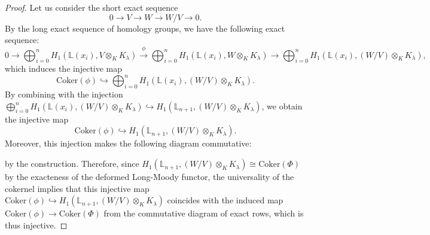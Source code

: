 \documentclass[a4paper,12pt]{article}
\theoremstyle{definition}
\theoremstyle{remark}
\begin{document}
\begin{proof}
Let us consider the
short exact sequence
\[
0\to V\to W\to W/V\to 0.
\]
By the long exact sequence of homology groups, we have the following exact sequence:
\[
	0\to \bigoplus_{i=0}^{n} H_1(\mathbb{L}(x_{i}), V\otimes_{K} K_{\lambda}) \xrightarrow{\phi} \bigoplus_{i=0}^{n} H_1(\mathbb{L}(x_{i}), W\otimes_{K} K_{\lambda}) \to \bigoplus_{i=0}^{n} H_1(\mathbb{L}(x_{i}), (W/V)\otimes_{K} K_{\lambda}),	
\]
which induces the injective map 
\[
	\mathrm{Coker}(\phi)
	\hookrightarrow \bigoplus_{i=0}^{n} H_1(\mathbb{L}(x_{i}), (W/V)\otimes_{K} K_{\lambda}).
\]
By combining with the injection $\bigoplus_{i=0}^{n} H_1(\mathbb{L}(x_{i}), (W/V)\otimes_{K} K_{\lambda})
\hookrightarrow H_{1}(\mathbb{L}_{n+1}, (W/V)\otimes_{K} K_{\lambda})$,
we obtain the injective map
\[
	\mathrm{Coker}(\phi)
	\hookrightarrow H_{1}(\mathbb{L}_{n+1}, (W/V)\otimes_{K} K_{\lambda}).
\]
Moreover, this injection makes the following diagram commutative:
\small
\begin{center}
\end{center}
\normalsize
by the construction.
Therefore, since $H_{1}(\mathbb{L}_{n+1}, (W/V)\otimes_{K} K_{\lambda})\cong \mathrm{Coker}(\Phi)$
by the exacteness of the deformed Long-Moody functor,
the universality of the cokernel implies that
this injective map $\mathrm{Coker}(\phi)
	\hookrightarrow H_{1}(\mathbb{L}_{n+1}, (W/V)\otimes_{K} K_{\lambda})$
coincides with the induced map $\mathrm{Coker}(\phi)\to \mathrm{Coker}(\Phi)$
from the commutative diagram of exact rows, which is thus injective.
\end{proof}
\end{document}
